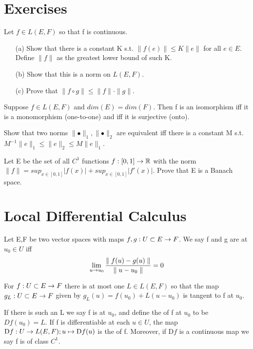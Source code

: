 \section*{Exercises}
\begin{exer}
Let $f\in L(E,F)$ so that f is continuous.
\begin{enumerate}
\item[(a)] Show that there is a constant K s.t. $\parallel f(e)\parallel\leq K\parallel e\parallel$ for all $e\in E$.
Define $\parallel f\parallel$ as the greatest lower bound of such K.
\item[(b)] Show that this is a norm on $L(E,F)$.
\item[(c)] Prove that $\parallel f\circ g\parallel\leq \parallel f\parallel \cdot \parallel g\parallel$.
\end{enumerate}
\end{exer}
\begin{exer}
Suppose $f\in L(E,F)$ and $dim(E)=dim(F)$. Then f is an isomorphism iff it is a monomorphism (one-to-one) and iff it is
surjective (onto).
\end{exer}
\begin{exer}
Show that two norms $\parallel\bullet\parallel_1,\parallel\bullet\parallel_2$ are equivalent iff there is a constant M
s.t. $M^{-1}\parallel e\parallel_1\leq \parallel e\parallel_2\leq M \parallel e\parallel_1$.
\end{exer}
\begin{exer}
Let E be the set of all $C^1$ functions ${f}:{[0,1]}\rightarrow{\mathbb{R}}$ with the norm $\parallel f\parallel=sup_{x\in
[0,1]}|f(x)|+ sup_{x\in [0,1]}|f'(x)|$. Prove that E is a Banach space.
\end{exer}
\section{Local Differential Calculus}
\begin{definition}
Let E,F be two vector spaces with maps ${f,g}:{U\subset E}\rightarrow{F}$. We say f and g are  at $u_0\in U$ iff
$$ \lim_{u\rightarrow u_0}\frac{\parallel{f(u)-g(u)}\parallel}{\parallel{u-u_0}\parallel}=0$$
\end{definition}
\begin{thm}
For ${f}:{U\subset E}\rightarrow{F}$ there is at most one $L\in L(E,F)$ so that the map ${g_L}:{U\subset E}\rightarrow{F}$ given by
$g_L(u)=f(u_0)+L(u-u_0)$ is tangent to f at $u_0$.
\end{thm}
\begin{definition}
If there is such an L we say f is  at $u_0$, and define the  of f at $u_0$ to be
$Df(u_0)=L$. If f is differentiable at each $u\in U$, the map ${\mathrm{D}f}:{U}\rightarrow{L(E,F)};u\mapsto \mathrm{D}f(u)$ 
is the  of f. Moreover, if $\mathrm{D}f$ is a continuous map we say f is of class $C^1$.
\end{definition}


